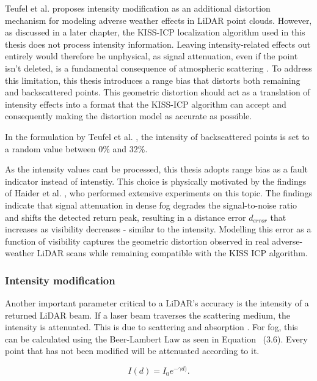Teufel et al. \cite{teufel_simulating_2022} proposes intensity modification as an additional distortion mechanism for modeling adverse weather effects in LiDAR point clouds. However, as discussed in a later chapter, the KISS-ICP localization algorithm used in this thesis does not process intensity information. Leaving intensity-related effects out entirely would therefore be unphysical, as signal attenuation, even if the point isn't deleted, is a fundamental consequence of atmospheric scattering \cite{bijelic_seeing_2019}. To address this limitation, this thesis introduces a range bias that distorts both remaining and backscattered points. This geometric distortion should act as a translation of intensity effects into a format that the KISS-ICP algorithm can accept and consequently making the distortion model as accurate as possible. 

In the formulation by Teufel et al. \cite{teufel_simulating_2022}, the intensity of backscattered points is set to a random value between 0\% and 32\%.

As the intensity values cant be processed, this thesis adopts range bias as a fault indicator instead of intenstiy. This choice is physically motivated by the findings of Haider et al. \cite{haider_methodology_2023}, who performed extensive experiments on this topic. The findings indicate that signal attenuation in dense fog degrades the signal-to-noise ratio and shifts the detected return peak, resulting in a distance error $d_{error}$ that increases as visibility decreases - similar to the intensity. Modelling this error as a function of visibility captures the geometric distortion observed in real adverse-weather LiDAR scans while remaining compatible with the KISS ICP algorithm. 
\subsubsection{Intensity modification}
Another important parameter critical to a LiDAR's accuracy is the intensity of a returned LiDAR beam. If a laser beam traverses the scattering medium, the intensity is attenuated. This is due to scattering and absorption \cite{kilic_lidar_2021}. For fog, this can be calculated using the Beer-Lambert Law as seen in Equation ~(3.6). Every point that has not been modified will be attenuated according to it.

\begin{equation}
    I(d) = I_0e^{-\gamma d)}. 
\end{equation}

